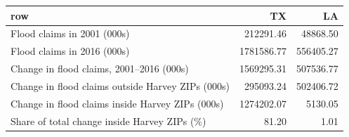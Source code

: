 \begin{tabular}{lrr}
  \hline
row & TX & LA \\ 
  \hline
Flood claims in 2001 (000s) & 212291.46 & 48868.50 \\ 
  Flood claims in 2016 (000s) & 1781586.77 & 556405.27 \\ 
  Change in flood claims, 2001–2016 (000s) & 1569295.31 & 507536.77 \\ 
  Change in flood claims outside Harvey ZIPs (000s) & 295093.24 & 502406.72 \\ 
  Change in flood claims inside Harvey ZIPs (000s) & 1274202.07 & 5130.05 \\ 
  Share of total change inside Harvey ZIPs (\%) & 81.20 & 1.01 \\ 
   \hline
\end{tabular}
